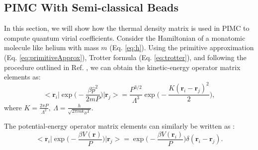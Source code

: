         \subsection{PIMC With Semi-classical Beads}\label{connections}
            In this section, we will show how the thermal density matrix is used in PIMC to compute quantum virial coefficients. Consider the Hamiltonian of a monatomic molecule like helium with mass $m$ (Eq. \eqref{eq:h}). Using the primitive approximation (Eq. \eqref{eq:primitiveApprox}), Trotter formula (Eq. \eqref{eq:trotter}), and following the procedure outlined in Ref. \cite{Garberoglio2009}, we can obtain the kinetic-energy operator matrix elements as:
            \begin{equation}\label{eq:kineticOperatorMatrix}
                \Bigg< \bm{r}_i \Bigg| \exp \Bigg(-\displaystyle\frac{\beta \hat{p}^2}{2 m P} \Bigg) \Bigg| \bm{r}_j \Bigg> = \displaystyle\frac{P^{3/2}}{\Lambda^3} \exp \Bigg(-\displaystyle\frac{K (\bm{r}_i - \bm{r}_j)^2}{2}\Bigg),
            \end{equation}
            where $K = \displaystyle\frac{2 \pi P}{\Lambda^2},\: \Lambda = \displaystyle\frac{h}{\sqrt{2\pi m k_B T}}$.

            The potential-energy operator matrix elements can similarly be written as \cite{Cui1997}:
            \begin{equation}\label{eq:potentialOperatorMatrix}
                \Bigg< \bm{r}_i \Bigg| \exp \Bigg(-\displaystyle\frac{\beta V(\bm{r})}{P} \Bigg) \Bigg| \bm{r}_j \Bigg> = \exp \Bigg(-\displaystyle\frac{\beta V(\bm{r}_i)}{P} \Bigg) \delta (\bm{r}_i - \bm{r}_j).
            \end{equation}

